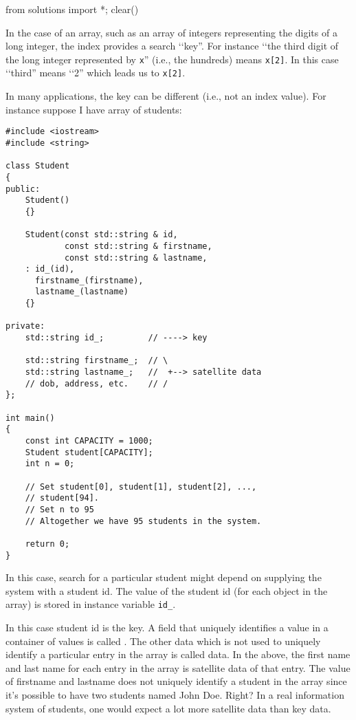 \begin{python0}
from solutions import *; clear()
\end{python0}

In the case of an array, such as an array of integers representing
the digits of a long integer, the index provides a search \lq\lq key''.
For instance \lq\lq the third digit of the long integer
represented by \texttt{x}'' (i.e., the hundreds)
means \verb!x[2]!.
In this case \lq\lq third'' means \lq\lq 2'' which leads us to
\verb!x[2]!.

In many applications, the key can be different (i.e., not an index value).
For instance suppose I have array of students:
\begin{Verbatim}[frame=single, fontsize=\footnotesize]
#include <iostream>
#include <string>

class Student
{
public:
    Student()
    {}
    
    Student(const std::string & id,
            const std::string & firstname,
            const std::string & lastname,
    : id_(id),
      firstname_(firstname),
      lastname_(lastname)
    {}
    
private:
    std::string id_;         // ----> key
    
    std::string firstname_;  // \
    std::string lastname_;   //  +--> satellite data
    // dob, address, etc.    // /
};

int main()
{
    const int CAPACITY = 1000;
    Student student[CAPACITY];
    int n = 0;
    
    // Set student[0], student[1], student[2], ...,
    // student[94].
    // Set n to 95
    // Altogether we have 95 students in the system.

    return 0;
}  
\end{Verbatim}


In this case, search for a particular student might depend on
supplying the system with a student id.
The value of the student id (for each object in the array)
is stored in instance variable
\verb!id_!.

In this case student id is the key.
A field that uniquely identifies a value in a container of values
is called \defone{key}.
The other data which is not used to uniquely identify a
particular entry in the array is called  data.
In the above, the first name and last name for each
entry in the array is satellite data of that entry.
The value of firstname and lastname does not uniquely identify
a student in the array since it's possible to have two students
named John Doe. 
Right?
In a real information system of students, one would expect
a lot more satellite data than key data.

